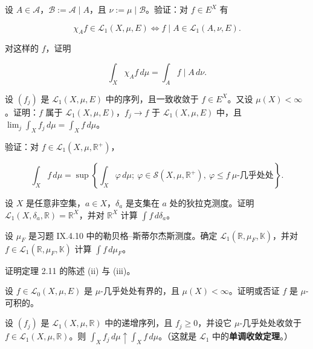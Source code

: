 \exerciseshead

\begin{exercises}
\item

设 $ A \in \mathcal{A} $，$ \mathcal{B} := \mathcal{A} \mid A $，且 $ \nu := \mu \mid \mathcal{B} $。验证：对 $ f \in E^X $ 有

\[
\chi_A f \in \mathcal{L}_1(X,\mu,E) \iff f \mid A \in \mathcal{L}_1(A,\nu,E) .
\]

对这样的 $ f $，证明

\[
\int_X \chi_A f \, d\mu = \int_A f \mid A \, d\nu .
\]
\item

设 $ (f_j) $ 是 $ \mathcal{L}_1(X,\mu,E) $ 中的序列，且一致收敛于 $ f \in E^X $。又设 $ \mu(X) < \infty $。证明：$ f $ 属于 $ \mathcal{L}_1(X,\mu,E) $，$ f_j \to f $ 于 $ \mathcal{L}_1(X,\mu,E) $ 中，且 $ \lim_j \int_X f_j \, d\mu = \int_X f \, d\mu $。

\item

验证：对 $ f \in \mathcal{L}_1(X,\mu,\mathbb{R}^+) $，

\[
\int_X f \, d\mu = \sup \left\{ \int_X \varphi \, d\mu ;\ \varphi \in \mathcal{S}(X,\mu,\mathbb{R}^+),\ \varphi \le f\ \mu\text{-几乎处处} \right\} .
\]
\item

设 $ X $ 是任意非空集，$ a \in X $，$ \delta_a $ 是支集在 $ a $ 处的狄拉克测度。证明 $ \mathcal{L}_1(X,\delta_a,\mathbb{R}) = \mathbb{R}^X $，并对 $ \mathbb{R}^X $ 计算 $ \int f \, d\delta_a $。

\item

设 $ \mu_F $ 是习题 IX.4.10 中的勒贝格–斯蒂尔杰斯测度。确定 $ \mathcal{L}_1(\mathbb{R},\mu_F,\mathbb{K}) $，并对 $ f \in \mathcal{L}_1(\mathbb{R},\mu_F,\mathbb{K}) $ 计算 $ \int f \, d\mu_F $。

\item

证明定理 2.11 的陈述 (ii) 与 (iii)。

\item

设 $ f \in \mathcal{L}_0(X,\mu,E) $ 是 $ \mu $-几乎处处有界的，且 $ \mu(X) < \infty $。证明或否证 $ f $ 是 $ \mu $-可积的。

\item

设 $ (f_j) $ 是 $ \mathcal{L}_1(X,\mu,\mathbb{R}) $ 中的递增序列，且 $ f_j \ge 0 $，并设它 $ \mu $-几乎处处收敛于 $ f \in \mathcal{L}_1(X,\mu,\mathbb{R}) $。则 $ \int_X f_j \, d\mu \uparrow \int_X f \, d\mu $。（这就是 $ \mathcal{L}_1 $ 中的\textbf{单调收敛定理}。）


\end{exercises}
